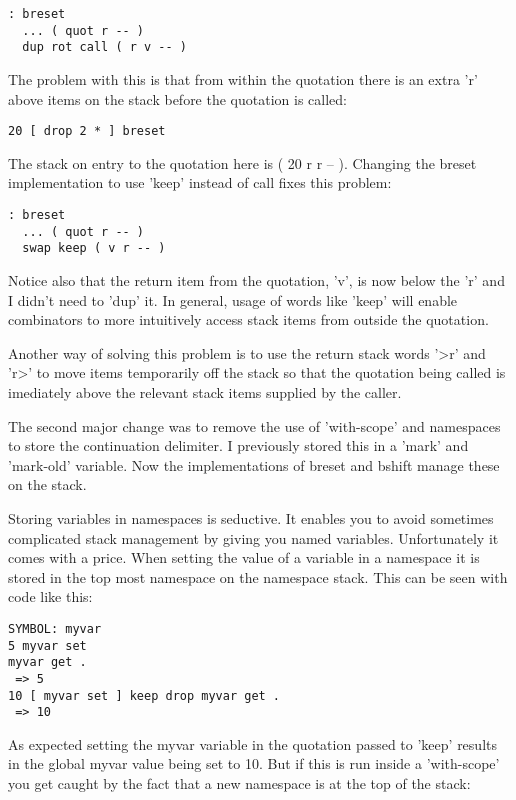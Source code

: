 \begin{verbatim}
: breset 
  ... ( quot r -- )
  dup rot call ( r v -- )
\end{verbatim}


The problem with this is that from within the quotation there is an
 extra 'r' above items on the stack before the quotation is called:

\begin{verbatim}
20 [ drop 2 * ] breset
\end{verbatim}


The stack on entry to the quotation here is ( 20 r r -- ). Changing
the breset implementation to use 'keep' instead of call fixes this
problem:


\begin{verbatim}
: breset 
  ... ( quot r -- )
  swap keep ( v r -- )
\end{verbatim}


Notice also that the return item from the quotation, 'v', is now below
the 'r' and I didn't need to 'dup' it. In general, usage of words like
'keep' will enable combinators to more intuitively access stack items
from outside the quotation.

Another way of solving this problem is to use the return stack words
'>r' and 'r>' to move items temporarily off the stack so that the
quotation being called is imediately above the relevant stack items
supplied by the caller.

The second major change was to remove the use of 'with-scope' and
namespaces to store the continuation delimiter. I previously stored
this in a 'mark' and 'mark-old' variable. Now the implementations of
breset and bshift manage these on the stack.

Storing variables in namespaces is seductive. It enables you to avoid
sometimes complicated stack management by giving you named
variables. Unfortunately it comes with a price. When setting the value
of a variable in a namespace it is stored in the top most namespace on
the namespace stack. This can be seen with code like this:


\begin{verbatim}
SYMBOL: myvar
5 myvar set
myvar get .
 => 5
10 [ myvar set ] keep drop myvar get .
 => 10
\end{verbatim}


As expected setting the myvar variable in the quotation passed to
 'keep' results in the global myvar value being set to 10. But if this
 is run inside a 'with-scope' you get caught by the fact that a new
 namespace is at the top of the stack:


